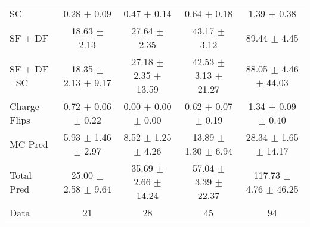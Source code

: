 \begin{tabular}{l|cccc}
                                 SC &  0.28 $\pm$  0.09 &  0.47 $\pm$  0.14 &  0.64 $\pm$  0.18 &  1.39 $\pm$  0.38 \\
                            SF + DF & 18.63 $\pm$  2.13 & 27.64 $\pm$  2.35 & 43.17 $\pm$  3.12 & 89.44 $\pm$  4.45 \\
\hline
                       SF + DF - SC & 18.35 $\pm$  2.13 $\pm$  9.17 & 27.18 $\pm$  2.35 $\pm$ 13.59 & 42.53 $\pm$  3.13 $\pm$ 21.27 & 88.05 $\pm$  4.46 $\pm$ 44.03 \\
\hline\hline
                       Charge Flips &  0.72 $\pm$  0.06 $\pm$  0.22 &  0.00 $\pm$  0.00 $\pm$  0.00 &  0.62 $\pm$  0.07 $\pm$  0.19 &  1.34 $\pm$  0.09 $\pm$  0.40 \\
\hline
                            MC Pred &  5.93 $\pm$  1.46 $\pm$  2.97 &  8.52 $\pm$  1.25 $\pm$  4.26 & 13.89 $\pm$  1.30 $\pm$  6.94 & 28.34 $\pm$  1.65 $\pm$ 14.17 \\
\hline
                         Total Pred & 25.00 $\pm$  2.58 $\pm$  9.64 & 35.69 $\pm$  2.66 $\pm$ 14.24 & 57.04 $\pm$  3.39 $\pm$ 22.37 & 117.73 $\pm$  4.76 $\pm$ 46.25 \\
\hline\hline
                               Data &    21 &    28 &    45 &    94 \\
\hline\hline
\end{tabular}

